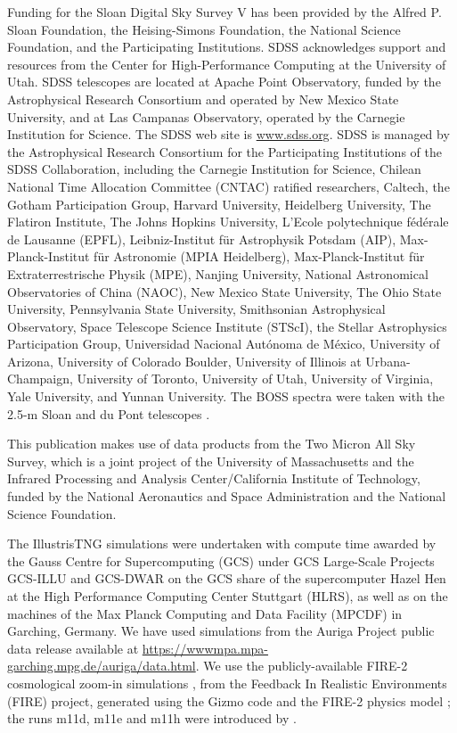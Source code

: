 \documentclass[fleqn,usenatbib,letters]{mnras}
\begin{document}
Funding for the Sloan Digital Sky Survey V has been provided by the Alfred P. Sloan Foundation, the Heising-Simons Foundation, the National Science Foundation, and the Participating Institutions. SDSS acknowledges support and resources from the Center for High-Performance Computing at the University of Utah. SDSS telescopes are located at Apache Point Observatory, funded by the Astrophysical Research Consortium and operated by New Mexico State University, and at Las Campanas Observatory, operated by the Carnegie Institution for Science. The SDSS web site is \href{https://www.sdss.org}{www.sdss.org}. SDSS is managed by the Astrophysical Research Consortium for the Participating Institutions of the SDSS Collaboration, including the Carnegie Institution for Science, Chilean National Time Allocation Committee (CNTAC) ratified researchers, Caltech, the Gotham Participation Group, Harvard University, Heidelberg University, The Flatiron Institute, The Johns Hopkins University, L'Ecole polytechnique f\'{e}d\'{e}rale de Lausanne (EPFL), Leibniz-Institut f\"{u}r Astrophysik Potsdam (AIP), Max-Planck-Institut f\"{u}r Astronomie (MPIA Heidelberg), Max-Planck-Institut f\"{u}r Extraterrestrische Physik (MPE), Nanjing University, National Astronomical Observatories of China (NAOC), New Mexico State University, The Ohio State University, Pennsylvania State University, Smithsonian Astrophysical Observatory, Space Telescope Science Institute (STScI), the Stellar Astrophysics Participation Group, Universidad Nacional Aut\'{o}noma de M\'{e}xico, University of Arizona, University of Colorado Boulder, University of Illinois at Urbana-Champaign, University of Toronto, University of Utah, University of Virginia, Yale University, and Yunnan University. The BOSS spectra were taken with the 2.5-m Sloan \citep{Gunn2006} and du Pont \citep{Bowen1973} telescopes \citep{Smee2013}.

This publication makes use of data products from the Two Micron All Sky Survey,
which is a joint project of the University of Massachusetts and the Infrared
Processing and Analysis Center/California Institute of Technology, funded by the
National Aeronautics and Space Administration and the National Science
Foundation.

The IllustrisTNG simulations were undertaken with compute time awarded by the
Gauss Centre for Supercomputing (GCS) under GCS Large-Scale Projects GCS-ILLU and
GCS-DWAR on the GCS share of the supercomputer Hazel Hen at the High Performance
Computing Center Stuttgart (HLRS), as well as on the machines of the Max Planck
Computing and Data Facility (MPCDF) in Garching, Germany. We have used
simulations from the Auriga Project \citep{Grand2017} public data release
\citep{Grand2024} available at \url{https://wwwmpa.mpa-garching.mpg.de/auriga/data.html}.
We use the publicly-available FIRE-2 cosmological zoom-in simulations
\citep{Wetzel2023,Wetzel2025}, from the Feedback In Realistic Environments (FIRE)
project, generated using the Gizmo code \citep{Hopkins2015} and the FIRE-2
physics model \citep{Hopkins2018}; the runs m11d, m11e and m11h were introduced
by \citet{ElBadry2018}.
\end{document}
